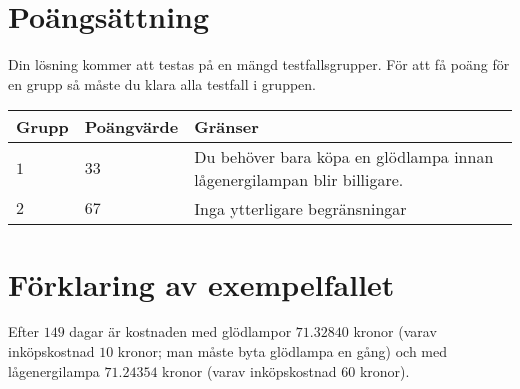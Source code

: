 \section*{Poängsättning}
Din lösning kommer att testas på en mängd testfallsgrupper.
För att få poäng för en grupp så måste du klara alla testfall i gruppen.

\noindent
\begin{tabular}{| l | l | l |}
  \hline
  Grupp & Poängvärde & Gränser \\ \hline
  $1$    & $33$        &  Du behöver bara köpa en glödlampa innan lågenergilampan blir billigare. \\ \hline
  $2$    & $67$        &  Inga ytterligare begränsningar \\ \hline
\end{tabular}

\section*{Förklaring av exempelfallet}
Efter $149$ dagar är kostnaden med glödlampor $71.32840$ kronor (varav inköpskostnad $10$ kronor; man måste byta glödlampa en gång) och med lågenergilampa $71.24354$ kronor (varav inköpskostnad $60$ kronor).
